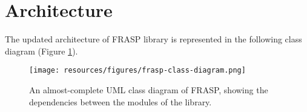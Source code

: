 
\section{Architecture}
\label{section:implementation:architecture}

The updated architecture of FRASP library is represented in the following class
diagram (Figure \ref{figure:frasp-class-diagram}).

\begin{figure}[!ht]
  \centering
  \texttt{[image: resources/figures/frasp-class-diagram.png]}
  \caption{
    An almost-complete UML class diagram of FRASP, showing the
    dependencies between the modules of the library.
  }
  \label{figure:frasp-class-diagram}
\end{figure}